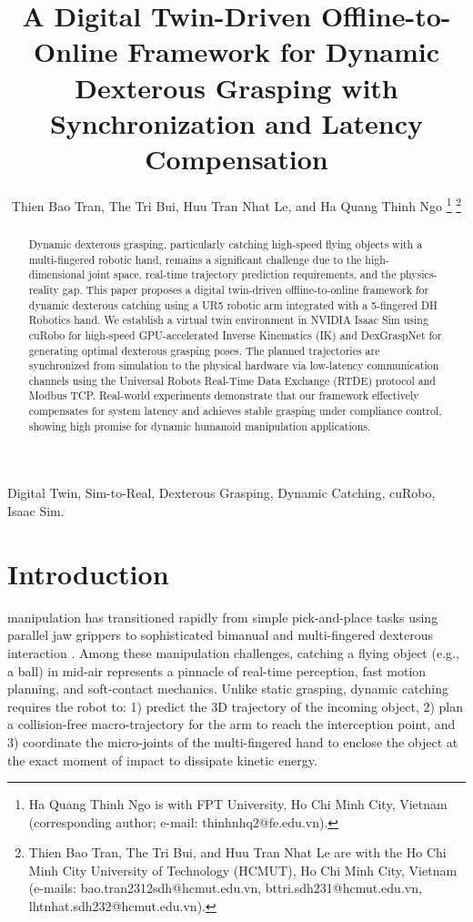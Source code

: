 \documentclass[letterpaper,journal]{IEEEtran}
\begin{document}
\title{A Digital Twin-Driven Offline-to-Online Framework for Dynamic Dexterous Grasping with Synchronization and Latency Compensation}

\author{Thien Bao Tran, The Tri Bui, Huu Tran Nhat Le, and Ha Quang Thinh Ngo
\thanks{Ha Quang Thinh Ngo is with FPT University, Ho Chi Minh City, Vietnam (corresponding author; e-mail: thinhnhq2@fe.edu.vn).}%
\thanks{Thien Bao Tran, The Tri Bui, and Huu Tran Nhat Le are with the Ho Chi Minh City University of Technology (HCMUT), Ho Chi Minh City, Vietnam (e-mails: bao.tran2312sdh@hcmut.edu.vn, bttri.sdh231@hcmut.edu.vn, lhtnhat.sdh232@hcmut.edu.vn).}}

\maketitle

\begin{abstract}
Dynamic dexterous grasping, particularly catching high-speed flying objects with a multi-fingered robotic hand, remains a significant challenge due to the high-dimensional joint space, real-time trajectory prediction requirements, and the physics-reality gap. This paper proposes a digital twin-driven offline-to-online framework for dynamic dexterous catching using a UR5 robotic arm integrated with a 5-fingered DH Robotics hand. We establish a virtual twin environment in NVIDIA Isaac Sim using cuRobo for high-speed GPU-accelerated Inverse Kinematics (IK) and DexGraspNet for generating optimal dexterous grasping poses. The planned trajectories are synchronized from simulation to the physical hardware via low-latency communication channels using the Universal Robots Real-Time Data Exchange (RTDE) protocol and Modbus TCP. Real-world experiments demonstrate that our framework effectively compensates for system latency and achieves stable grasping under compliance control, showing high promise for dynamic humanoid manipulation applications.
\end{abstract}

\begin{IEEEkeywords}
Digital Twin, Sim-to-Real, Dexterous Grasping, Dynamic Catching, cuRobo, Isaac Sim.
\end{IEEEkeywords}

\section{Introduction}
 manipulation has transitioned rapidly from simple pick-and-place tasks using parallel jaw grippers to sophisticated bimanual and multi-fingered dexterous interaction \cite{trx_hand5, dexco_hand, manufacturing_hand_review, bimanual_manipulation}. Among these manipulation challenges, catching a flying object (e.g., a ball) in mid-air represents a pinnacle of real-time perception, fast motion planning, and soft-contact mechanics. Unlike static grasping, dynamic catching requires the robot to: 1) predict the 3D trajectory of the incoming object, 2) plan a collision-free macro-trajectory for the arm to reach the interception point, and 3) coordinate the micro-joints of the multi-fingered hand to enclose the object at the exact moment of impact to dissipate kinetic energy.
\end{document}
